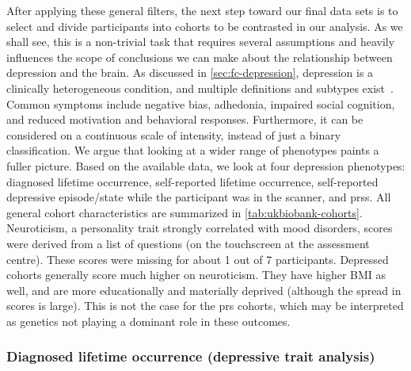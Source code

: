 After applying these general filters, the next step toward our final data sets is to select and divide participants into cohorts to be contrasted in our analysis.
As we shall see, this is a non-trivial task that requires several assumptions and heavily influences the scope of conclusions we can make about the relationship between depression and the brain.
As discussed in \cref{sec:fc-depression}, depression is a clinically heterogeneous condition, and multiple definitions and subtypes exist~\parencite[see also][]{Fried2022}.
Common symptoms include negative bias, adhedonia, impaired social cognition, and reduced motivation and behavioral responses.
Furthermore, it can be considered on a continuous scale of intensity, instead of just a binary classification.
We argue that looking at a wider range of phenotypes paints a fuller picture.
Based on the available data, we look at four depression phenotypes: diagnosed lifetime occurrence, self-reported lifetime occurrence,
self-reported depressive episode/state while the participant was in the scanner, and \glspl{prs}.
All general cohort characteristics are summarized in \cref{tab:ukbiobank-cohorts}.
Neuroticism, a personality trait strongly correlated with mood disorders, scores were derived from a list of questions (on the touchscreen at the assessment centre).
These scores were missing for about 1 out of 7 participants.
Depressed cohorts generally score much higher on neuroticism.
They have higher BMI as well, and are more educationally and materially deprived (although the spread in scores is large).
This is not the case for the \gls{prs} cohorts, which may be interpreted as genetics not playing a dominant role in these outcomes.



\subsubsection{Diagnosed lifetime occurrence (depressive trait analysis)}


